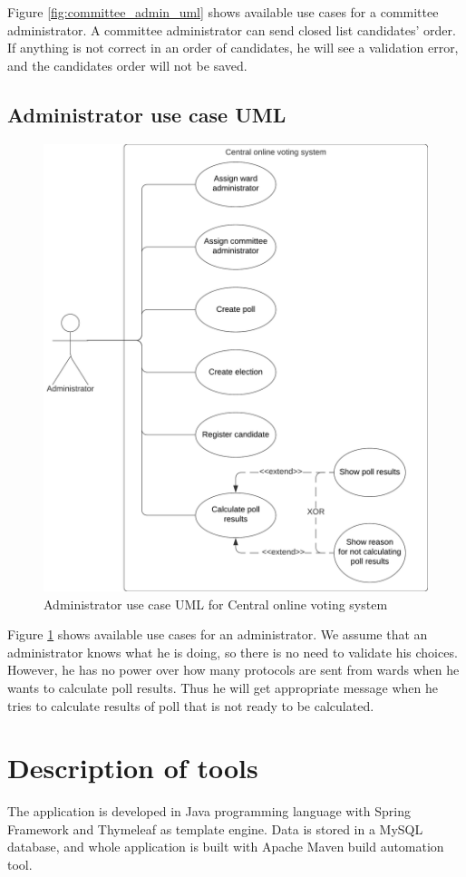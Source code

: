 \documentclass[a4paper,twoside,12pt]{book}
\newcommand{\Title}{Central online voting system}
\begin{document}
    Figure \ref{fig:committee_admin_uml} shows available use cases for a committee administrator. A committee administrator can send closed list candidates' order.
    If anything is not correct in an order of candidates, he will see a validation error, and the candidates order will not be saved.
    \pagebreak

    \subsection{Administrator use case UML}
    \begin{figure}[h]
      \centering
      \includegraphics[width=0.8\linewidth]{admin_uml.png}
      \caption{Administrator use case UML for \Title}
      \label{fig:admin_uml}
    \end{figure}

    Figure \ref{fig:admin_uml} shows available use cases for an administrator. We assume that an administrator knows what he is doing, so there is no need to validate his choices.
    However, he has no power over how many protocols are sent from wards when he wants to calculate poll results. 
    Thus he will get appropriate message when he tries to calculate results of poll that is not ready to be calculated.

  \section{Description of tools}
    The application is developed in Java programming language with Spring Framework and Thymeleaf as template engine. 
    Data is stored in a MySQL database, and whole application is built with  Apache Maven build automation tool.
\end{document}
